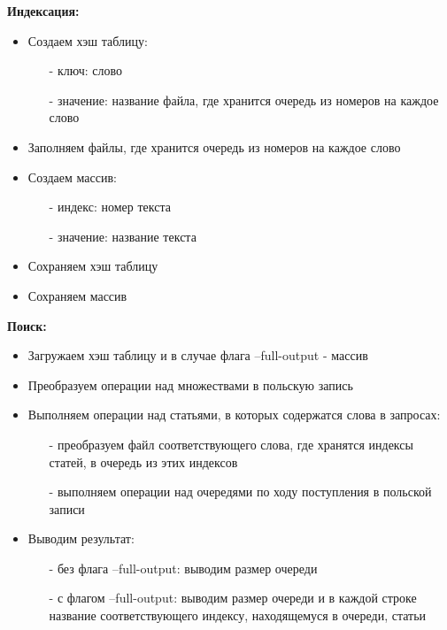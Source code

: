\documentclass[12pt]{article}
\begin{document}
\textbf{Индексация:}
\begin{itemize}
    \item Создаем хэш таблицу:
    \begin{itemize}
        \item[-] ключ: слово
        \item[-] значение: название файла, где хранится очередь из номеров на каждое слово
    \end{itemize}
    \item Заполняем файлы, где хранится очередь из номеров на каждое слово
    \item Создаем массив:
    \begin{itemize}
        \item[-] индекс: номер текста
        \item[-] значение: название текста
    \end{itemize}
    \item Сохраняем хэш таблицу
    \item Сохраняем массив
\end{itemize}
\textbf{Поиск:}
\begin{itemize}
    \item Загружаем хэш таблицу и в случае флага --full-output - массив
    \item Преобразуем операции над множествами в польскую запись
    \item Выполняем операции над статьями, в которых содержатся слова в запросах:
    \begin{itemize}
        \item[-] преобразуем файл соответствующего слова, где хранятся индексы статей, в очередь из этих индексов
        \item[-] выполняем операции над очередями по ходу поступления в польской записи
    \end{itemize}
    \item Выводим результат:
    \begin{itemize}
        \item[-] без флага --full-output: выводим размер очереди
        \item[-] с флагом --full-output: выводим размер очереди и в каждой строке название соответствующего индексу, находящемуся в очереди, статьи
    \end{itemize}
\end{itemize}
\end{document}
